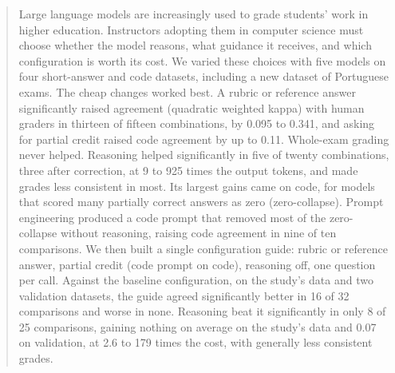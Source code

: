 \documentclass{ieeeaccess}
\begin{document}
\begin{abstract}
Large language models are increasingly used to grade students' work in higher education. Instructors adopting
them in computer science must choose whether the model reasons, what guidance it receives, and which configuration
is worth its cost. We varied these choices with five models on four
short-answer and code datasets, including a new dataset of Portuguese exams. The cheap changes worked best. A rubric or reference
answer significantly raised agreement (quadratic weighted kappa) with human graders in thirteen of fifteen
combinations, by 0.095 to 0.341, and asking for partial credit raised code agreement by up to 0.11. Whole-exam
grading never helped. Reasoning helped significantly in five of twenty combinations, three after correction, at 9
to 925 times the output tokens, and made grades less consistent in most. Its largest gains came on code, for models
that scored many partially correct answers as zero (zero-collapse).
Prompt engineering produced a code prompt that removed most of the zero-collapse without reasoning,
raising code agreement in nine of ten comparisons. We then built a single configuration guide: rubric or reference
answer, partial credit (code prompt on code), reasoning off, one question per call. Against the baseline configuration, on the study's data and two validation datasets, the guide agreed significantly better in 16 of 32
comparisons and worse in none. Reasoning beat it significantly in only 8
of 25 comparisons, gaining nothing on average on the study's data and 0.07 on validation, at 2.6 to 179 times
the cost, with generally less consistent grades.
\end{abstract}
\end{document}

